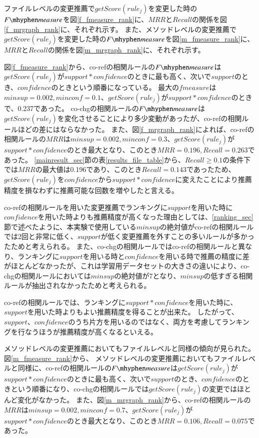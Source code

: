 \documentclass[a4paper]{jsbook}
\newcommand{\minconf}{mincon\!f}
\newcommand{\confidence}{con\!f\!idence}
\newcommand{\fmeasure}{F\mhyphen measure}
\newcommand{\getScore}{getS\!core}
\begin{document}
ファイルレベルの変更推薦で$\getScore(rule_j)$を変更した時の$\fmeasure$を図\ref{f_fmeasure_rank}に、$MRR$と$Recall$の関係を図\ref{f_mrgraph_rank}に、それぞれ示す。
また、メソッドレベルの変更推薦で$\getScore(rule_j)$を変更した時の$\fmeasure$を図\ref{m_fmeasure_rank}に、$MRR$と$Recall$の関係を図\ref{m_mrgraph_rank}に、それぞれ示す。

図\ref{f_fmeasure_rank}から、co-refの相関ルールの$\fmeasure$は$\getScore(rule_j)$が$support*\confidence$のときに最も高く、次いで$support$のとき、$\confidence$のときという順番になっている。
最大の$fmeasure$は$minsup=0.002,\minconf=0.1$、$\getScore(rule_j)$が$support*\confidence$のときで、0.237であった。
co-chgの相関ルールの$\fmeasure$は$\getScore(rule_j)$を変化させることにより多少変動があったが、co-refの相関ルールほどの差にはならなかった。
また、図\ref{f_mrgraph_rank}によれば、co-refの相関ルールの$MRR$は$minsup=0.002,\minconf=0.3$、$\getScore(rule_j)$が$support*\confidence$のとき最大となり、このとき$MRR=0.196,Recall=0.263$であった。
\ref{mainresult_sec}節の表\ref{results_file_table}から、$Recall\geq 0.1$の条件下では$MRR$の最大値は0.196であり、このとき$Recall=0.143$であったため、$\getScore(rule_j)$を$\confidence$から$support*\confidence$に変えたことにより推薦精度を損なわずに推薦可能な回数を増やしたと言える。

co-refの相関ルールを用いた変更推薦でランキングに$support$を用いた時に$\confidence$を用いた時よりも推薦精度が高くなった理由としては、\ref{ranking_sec}節で述べたように、本実験で使用している$minsup$の絶対値がco-refの相関ルールでは2回と非常に低く、$support$が低く変更推薦を外すことの多いルールが多かったためと考えられる。
また、co-chgの相関ルールではco-refの相関ルールと異なり、ランキングに$support$を用いる時と$\confidence$を用いる時で推薦の精度に差がほとんどなかったが、これは学習用データセットの大きさの違いにより、co-chgの相関ルールにおいては$minsup$の絶対値が7となり、$minsup$の低すぎる相関ルールが抽出されなかったためと考えられる。

co-refの相関ルールでは、ランキングに$support*\confidence$を用いた時に、$support$を用いた時よりもよい推薦精度を得ることが出来た。
したがって、$support$、$\confidence$のうち片方を用いるのではなく、両方を考慮してランキングを行なうほうが推薦精度が高くなるといえる。

メソッドレベルの変更推薦においてもファイルレベルと同様の傾向が見られた。
図\ref{m_fmeasure_rank}から、
メソッドレベルの変更推薦においてもファイルレベルと同様に、co-refの相関ルールの$\fmeasure$は$\getScore(rule_j)$が$support*\confidence$のときに最も高く、次いで$support$のとき、$\confidence$のときという順番になり、co-chgの相関ルールでは$\getScore(rule_j)$の変更ではほとんど変化がなかった。
また、図\ref{m_mrgraph_rank}から、co-refの相関ルールの$MRR$は$minsup=0.002,\minconf=0.7$、$\getScore(rule_j)$が$support*\confidence$のとき最大となり、このとき$MRR=0.106,Recall=0.075$であった。
\end{document}
